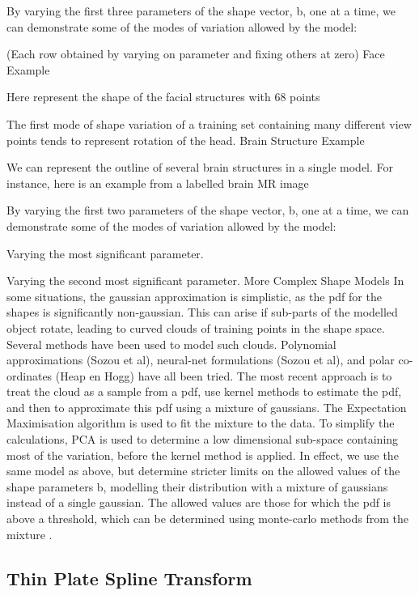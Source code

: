 By varying the first three parameters of the shape vector, b, one at a time, we can demonstrate some of the modes of variation allowed by the model:

(Each row obtained by varying on parameter and fixing others at zero)
Face Example

Here represent the shape of the facial structures with 68 points

The first mode of shape variation of a training set containing many different view points tends to represent rotation of the head.
Brain Structure Example

We can represent the outline of several brain structures in a single model.
For instance, here is an example from a labelled brain MR image

By varying the first two parameters of the shape vector, b, one at a time, we can demonstrate some of the modes of variation allowed by the model:

Varying the most significant parameter.

Varying the second most significant parameter.
More Complex Shape Models
In some situations, the gaussian approximation is simplistic, as the pdf for the shapes is significantly non-gaussian. This can arise if sub-parts of the modelled object rotate, leading to curved clouds of training points in the shape space. Several methods have been used to model such clouds. Polynomial approximations (Sozou et al), neural-net formulations (Sozou et al), and polar co-ordinates (Heap en Hogg) have all been tried. The most recent approach is to treat the cloud as a sample from a pdf, use kernel methods to estimate the pdf, and then to approximate this pdf using a mixture of gaussians. The Expectation Maximisation algorithm is used to fit the mixture to the data. To simplify the calculations, PCA is used to determine a low dimensional sub-space containing most of the variation, before the kernel method is applied. In effect, we use the same model as above, but determine stricter limits on the allowed values of the shape parameters b, modelling their distribution with a mixture of gaussians instead of a single gaussian. The allowed values are those for which the pdf is above a threshold, which can be determined using monte-carlo methods from the mixture .


\subsection{Thin Plate Spline Transform}
